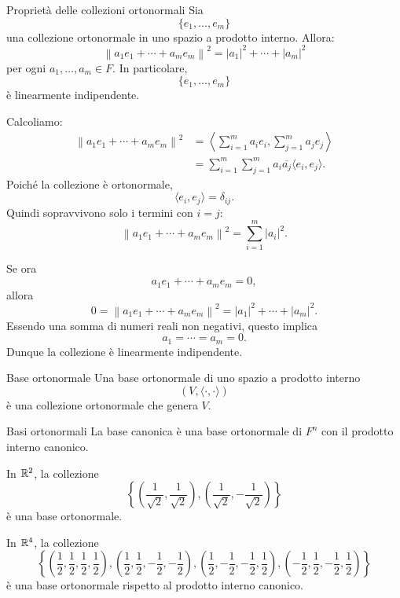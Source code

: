 \documentclass[a4paper]{article}
\begin{document}
\begin{snippetproposition}{Proprietà delle collezioni ortonormali}
    Sia
    \[
        \{e_1,\ldots,e_m\}
    \]
    una collezione ortonormale in uno spazio a prodotto interno. Allora:
    \[
        \left\|
        a_1e_1+\cdots+a_me_m
        \right\|^2
        =
        |a_1|^2+\cdots+|a_m|^2
    \]
    per ogni \(a_1,\ldots,a_m\in F\). In particolare,
    \[
        \{e_1,\ldots,e_m\}
    \]
    è linearmente indipendente.
\end{snippetproposition}

\begin{snippetproof}{}
    Calcoliamo:
    \begin{align*}
        \left\|
        a_1e_1+\cdots+a_me_m
        \right\|^2
        &=
        \left\langle
        \sum_{i=1}^{m}a_ie_i,
        \sum_{j=1}^{m}a_je_j
        \right\rangle\\
        &=
        \sum_{i=1}^{m}\sum_{j=1}^{m}
        a_i\overline{a_j}\langle e_i,e_j\rangle.
    \end{align*}
    Poiché la collezione è ortonormale,
    \[
        \langle e_i,e_j\rangle=\delta_{ij}.
    \]
    Quindi sopravvivono solo i termini con \(i=j\):
    \[
        \left\|
        a_1e_1+\cdots+a_me_m
        \right\|^2
        =
        \sum_{i=1}^{m}|a_i|^2.
    \]

    Se ora
    \[
        a_1e_1+\cdots+a_me_m=0,
    \]
    allora
    \[
        0
        =
        \left\|
        a_1e_1+\cdots+a_me_m
        \right\|^2
        =
        |a_1|^2+\cdots+|a_m|^2.
    \]
    Essendo una somma di numeri reali non negativi, questo implica
    \[
        a_1=\cdots=a_m=0.
    \]
    Dunque la collezione è linearmente indipendente.
\end{snippetproof}

\begin{snippetdefinition}{Base ortonormale}
    Una base ortonormale di uno spazio a prodotto interno
    \[
        (V,\langle\cdot,\cdot\rangle)
    \]
    è una collezione ortonormale che genera \(V\).
\end{snippetdefinition}

\begin{snippetexample}{Basi ortonormali}
    La base canonica è una base ortonormale di \(F^n\) con il prodotto interno canonico.

    In \(\mathbb{R}^2\), la collezione
    \[
        \left\{
            \left(\frac{1}{\sqrt{2}},\frac{1}{\sqrt{2}}\right),
            \left(\frac{1}{\sqrt{2}},-\frac{1}{\sqrt{2}}\right)
        \right\}
    \]
    è una base ortonormale.

    In \(\mathbb{R}^4\), la collezione
    \[
        \left\{
            \left(\frac{1}{2},\frac{1}{2},\frac{1}{2},\frac{1}{2}\right),
            \left(\frac{1}{2},\frac{1}{2},-\frac{1}{2},-\frac{1}{2}\right),
            \left(\frac{1}{2},-\frac{1}{2},-\frac{1}{2},\frac{1}{2}\right),
            \left(-\frac{1}{2},\frac{1}{2},-\frac{1}{2},\frac{1}{2}\right)
        \right\}
    \]
    è una base ortonormale rispetto al prodotto interno canonico.
\end{snippetexample}
\end{document}

